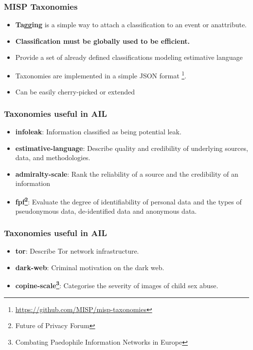 \documentclass{beamer}
\begin{document}
\begin{frame}
    \frametitle{MISP Taxonomies}
        \begin{itemize}
            \item {\bf Tagging} is a simple way to attach a classification to an event or anattribute.
            \item {\bf Classification must be globally used to be efficient.}
            \item Provide a set of already defined classifications modeling estimative language
            \item Taxonomies are implemented in a simple JSON format \footnote{\url{https://github.com/MISP/misp-taxonomies}}.
            \item Can be easily cherry-picked or extended
        \end{itemize}
\end{frame}

\begin{frame}
    \frametitle{Taxonomies useful in AIL}
        \begin{itemize}
            \item {\bf infoleak}: Information classified as being potential leak.
            \item {\bf estimative-language}: Describe quality and credibility of underlying sources, data, and methodologies.
            \item {\bf admiralty-scale}: Rank the reliability of a source and the credibility of an information
            \item {\bf fpf\footnote{Future of Privacy Forum}}: Evaluate the degree of identifiability of personal data and the types of pseudonymous data, de-identified data and anonymous data.
        \end{itemize}
\end{frame}

\begin{frame}
    \frametitle{Taxonomies useful in AIL}
        \begin{itemize}
            \item {\bf tor}: Describe Tor network infrastructure.
            \item {\bf dark-web}: Criminal motivation on the dark web.
            \item {\bf copine-scale\footnote{Combating Paedophile Information Networks in Europe}}: Categorise the severity of images of child sex abuse.
        \end{itemize}
\end{frame}
\end{document}
